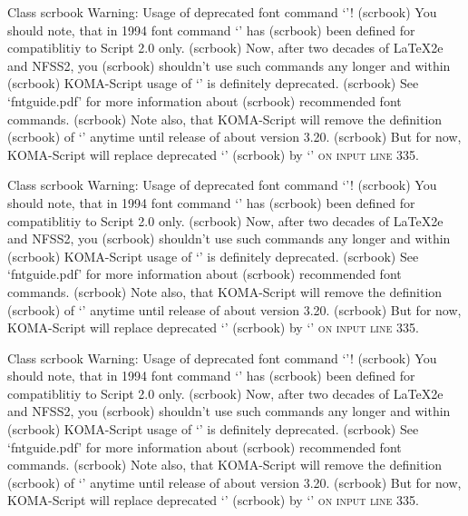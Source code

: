 Class scrbook Warning: Usage of deprecated font command `\sc'!
(scrbook)              You should note, that in 1994 font command `\sc' has
(scrbook)              been defined for compatiblitiy to Script 2.0 only.
(scrbook)              Now, after two decades of LaTeX2e and NFSS2, you
(scrbook)              shouldn't use such commands any longer and within
(scrbook)              KOMA-Script usage of `\sc' is definitely deprecated.
(scrbook)              See `fntguide.pdf' for more information about
(scrbook)              recommended font commands.
(scrbook)              Note also, that KOMA-Script will remove the definition
(scrbook)              of `\sc' anytime until release of about version 3.20.
(scrbook)              But for now, KOMA-Script will replace deprecated `\sc'
(scrbook)              by `\normalfont \scshape ' on input line 335.


Class scrbook Warning: Usage of deprecated font command `\sc'!
(scrbook)              You should note, that in 1994 font command `\sc' has
(scrbook)              been defined for compatiblitiy to Script 2.0 only.
(scrbook)              Now, after two decades of LaTeX2e and NFSS2, you
(scrbook)              shouldn't use such commands any longer and within
(scrbook)              KOMA-Script usage of `\sc' is definitely deprecated.
(scrbook)              See `fntguide.pdf' for more information about
(scrbook)              recommended font commands.
(scrbook)              Note also, that KOMA-Script will remove the definition
(scrbook)              of `\sc' anytime until release of about version 3.20.
(scrbook)              But for now, KOMA-Script will replace deprecated `\sc'
(scrbook)              by `\normalfont \scshape ' on input line 335.


Class scrbook Warning: Usage of deprecated font command `\sc'!
(scrbook)              You should note, that in 1994 font command `\sc' has
(scrbook)              been defined for compatiblitiy to Script 2.0 only.
(scrbook)              Now, after two decades of LaTeX2e and NFSS2, you
(scrbook)              shouldn't use such commands any longer and within
(scrbook)              KOMA-Script usage of `\sc' is definitely deprecated.
(scrbook)              See `fntguide.pdf' for more information about
(scrbook)              recommended font commands.
(scrbook)              Note also, that KOMA-Script will remove the definition
(scrbook)              of `\sc' anytime until release of about version 3.20.
(scrbook)              But for now, KOMA-Script will replace deprecated `\sc'
(scrbook)              by `\normalfont \scshape ' on input line 335.



